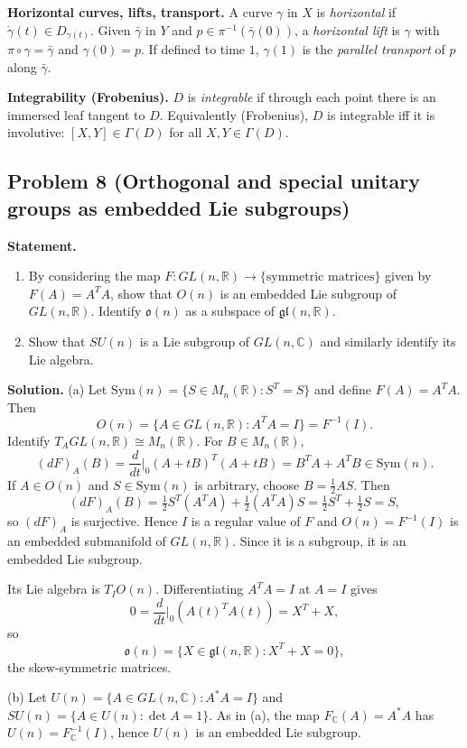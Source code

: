 \documentclass[12pt,a4paper]{article}
\theoremstyle{plain}
\theoremstyle{definition}      %
\begin{document}
\textbf{Horizontal curves, lifts, transport.}
A curve $\gamma$ in $X$ is \emph{horizontal} if $\dot\gamma(t)\in D_{\gamma(t)}$.
Given $\bar\gamma$ in $Y$ and $p\in\pi^{-1}(\bar\gamma(0))$, a \emph{horizontal lift} is $\gamma$ with
$\pi\circ\gamma=\bar\gamma$ and $\gamma(0)=p$.
If defined to time $1$, $\gamma(1)$ is the \emph{parallel transport} of $p$ along $\bar\gamma$.

\textbf{Integrability (Frobenius).}
$D$ is \emph{integrable} if through each point there is an immersed leaf tangent to $D$.
Equivalently (Frobenius), $D$ is integrable iff it is involutive: $[X,Y]\in\Gamma(D)$ for all $X,Y\in\Gamma(D)$.




\subsection*{Problem 8 (Orthogonal and special unitary groups as embedded Lie subgroups)}
\textbf{Statement.}
\begin{enumerate}
	\item[(a)] By considering the map $F:GL(n,\mathbb R)\to\{\text{symmetric matrices}\}$ given by $F(A)=A^TA$,
	show that $O(n)$ is an embedded Lie subgroup of $GL(n,\mathbb R)$.
	Identify $\mathfrak o(n)$ as a subspace of $\mathfrak{gl}(n,\mathbb R)$.
	\item[(b)] Show that $SU(n)$ is a Lie subgroup of $GL(n,\mathbb C)$ and similarly identify its Lie algebra.
\end{enumerate}

\textbf{Solution.}
(a) Let $\mathrm{Sym}(n)=\{S\in M_n(\mathbb R):S^T=S\}$ and define $F(A)=A^TA$.
Then
\[
O(n)=\{A\in GL(n,\mathbb R):A^TA=I\}=F^{-1}(I).
\]
Identify $T_AGL(n,\mathbb R)\cong M_n(\mathbb R)$. For $B\in M_n(\mathbb R)$,
\[
(dF)_A(B)=\frac{d}{dt}\Big|_{0}(A+tB)^T(A+tB)=B^TA+A^TB\in\mathrm{Sym}(n).
\]
If $A\in O(n)$ and $S\in\mathrm{Sym}(n)$ is arbitrary, choose $B=\tfrac12 AS$. Then
\[
(dF)_A(B)=\tfrac12 S^T(A^TA)+\tfrac12(A^TA)S=\tfrac12 S^T+\tfrac12 S=S,
\]
so $(dF)_A$ is surjective. Hence $I$ is a regular value of $F$ and $O(n)=F^{-1}(I)$
is an embedded submanifold of $GL(n,\mathbb R)$. Since it is a subgroup, it is an embedded Lie subgroup.

Its Lie algebra is $T_IO(n)$. Differentiating $A^TA=I$ at $A=I$ gives
\[
0=\frac{d}{dt}\Big|_{0}(A(t)^TA(t))=X^T+X,
\]
so
\[
\mathfrak o(n)=\{X\in\mathfrak{gl}(n,\mathbb R):X^T+X=0\},
\]
the skew-symmetric matrices.

(b) Let $U(n)=\{A\in GL(n,\mathbb C):A^*A=I\}$ and $SU(n)=\{A\in U(n):\det A=1\}$.
As in (a), the map $F_{\mathbb C}(A)=A^*A$ has $U(n)=F_{\mathbb C}^{-1}(I)$, hence $U(n)$ is an embedded Lie subgroup.
\end{document}
